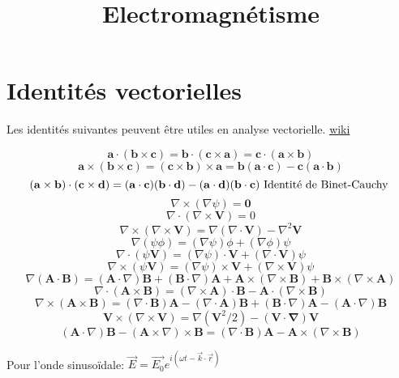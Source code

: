 \documentclass{article}
\begin{document}
\title{Electromagn\'etisme}
\author{}
\maketitle
\tableofcontents
\newpage

\section{Identit\'es vectorielles}
Les identit\'es suivantes peuvent être utiles en analyse vectorielle.
\href{http://fr.wikipedia.org/wiki/Identit%C3%A9s_vectorielles}{wiki}

$$ \mathbf a \cdot (\mathbf b \times \mathbf c) = \mathbf b\cdot(\mathbf c \times \mathbf a) = \mathbf c\cdot(\mathbf a\times \mathbf b) $$
$$ \mathbf a\times (\mathbf b\times \mathbf c) = (\mathbf c \times \mathbf b) \times \mathbf a = \mathbf b (\mathbf a \cdot \mathbf c) - \mathbf c(\mathbf a\cdot \mathbf b) $$
$$ (\mathbf a \times \mathbf b)\cdot(\mathbf c \times \mathbf d) = (\mathbf a \cdot \mathbf c)(\mathbf b \cdot \mathbf d) - (\mathbf a\cdot \mathbf d)(\mathbf b\cdot \mathbf c) \text{ Identit\'e de Binet-Cauchy } $$
$$ \nabla \times (\nabla \psi) = \mathbf 0 $$
$$ \nabla \cdot (\nabla \times \mathbf V) = 0 $$
$$ \nabla\times(\nabla\times\mathbf V) = \nabla(\nabla\cdot \mathbf V)-\nabla^2\mathbf V $$
$$ \nabla(\psi\phi) = (\nabla\psi)\phi + (\nabla\phi)\psi $$
$$ \nabla \cdot (\psi\mathbf V) = (\nabla\psi)\cdot \mathbf V + (\nabla \cdot \mathbf V)\psi $$
$$ \nabla \times (\psi\mathbf V) = (\nabla\psi)\times \mathbf V + (\nabla\times\mathbf V)\psi $$
$$ \nabla(\mathbf A\cdot \mathbf B) = (\mathbf A \cdot \nabla)\mathbf B+(\mathbf B\cdot \nabla)\mathbf A + \mathbf A\times(\nabla\times \mathbf B) + \mathbf B\times(\nabla \times \mathbf A) $$
$$ \nabla\cdot(\mathbf A \times \mathbf B) = (\nabla\times\mathbf A)\cdot \mathbf B - \mathbf A\cdot(\nabla\times\mathbf B) $$
$$ \nabla \times (\mathbf A\times \mathbf B) = (\nabla\cdot \mathbf B)\mathbf A - (\nabla\cdot \mathbf A)\mathbf B + (\mathbf B\cdot \nabla)\mathbf A - (\mathbf A\cdot\nabla)\mathbf B $$
$$ \mathbf V \times (\nabla \times \mathbf V)=\nabla (\mathbf V^2/2) - (\mathbf V\cdot \mathbf \nabla)\mathbf V $$
$$ (\mathbf A \cdot \nabla) \mathbf B - (\mathbf A \times \nabla) \times \mathbf B = (\nabla \cdot \mathbf B) \mathbf A - \mathbf A \times (\nabla \times \mathbf B) $$

\bigskip
Pour l'onde sinuso\"idale: 
$\vec{E} = \vec{E_0} e^{i(\omega t - \vec{k}\cdot \vec{r})}$
\end{document}
